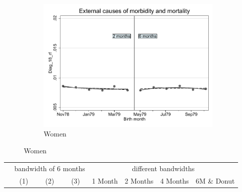 \documentclass[a4paper ]{article}
\begin{document}
\begin{figure}[h]
\begin{subfigure}[t]{0.31\textwidth}
		\centering
		\includegraphics[width=0.99\textwidth]{R1_RD_Diag_18_rf_fits}
		\caption{Women}
	\end{subfigure}
\end{figure}


\begin{table}[h]\centering
\def\sym#1{\ifmmode^{#1}\else\(^{#1}\)\fi}
\begin{tabular}{l*{3}{c}|cccc}
\toprule
&\multicolumn{3}{c}{bandwidth of 6 months} & \multicolumn{4}{c}{different bandwidths} \\
 \cmidrule(lr{1em}){2-4} \cmidrule(lr{1em}){5-8}
 &\multicolumn{1}{c}{(1)}&\multicolumn{1}{c}{(2)}&\multicolumn{1}{c}{(3)}& 1 Month & 2 Months & 4 Months & 6M \& Donut \\
\midrule 

\bottomrule
\end{tabular}
\end{table}
\end{document}
